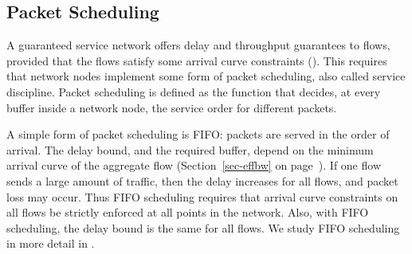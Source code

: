 \subsection{Packet Scheduling}
A guaranteed service network offers delay and throughput
guarantees to flows, provided that the flows satisfy some arrival
curve constraints (). This requires that network
nodes implement some form of packet scheduling, also called
service discipline. Packet scheduling is defined as the function
that decides, at every buffer inside a network node, the service
order for different packets.

A simple form of packet scheduling is FIFO: packets are served in
the order of arrival. The delay bound, and the required buffer,
depend on the minimum arrival curve of the aggregate flow
(Section~\ref{sec-effbw} on page~\pageref{sec-effbw}). If one flow
sends a large amount of traffic, then the delay increases for all
flows, and packet loss may occur. Thus FIFO scheduling requires
that arrival curve constraints on all flows be strictly enforced
at all points in the network. Also, with FIFO scheduling, the
delay bound is the same for all flows. We study FIFO scheduling in
more detail in .

